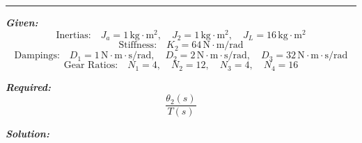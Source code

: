 \documentclass[11pt]{article}
\begin{document}
\noindent\rule{\textwidth}{1pt}

\vspace{12pt}


\noindent\textbf{\textit{Given:}}
\[
\text{Inertias:} \quad J_a = 1\,\text{kg}\cdot\text{m}^2, \quad J_2 = 1\,\text{kg}\cdot\text{m}^2, \quad J_L = 16\,\text{kg}\cdot\text{m}^2
\]
\[
\text{Stiffness:} \quad K_2 = 64\,\text{N}\cdot\text{m/rad}
\]
\[
\text{Dampings:} \quad D_1 = 1\,\text{N}\cdot\text{m}\cdot\text{s/rad}, \quad D_2 = 2\,\text{N}\cdot\text{m}\cdot\text{s/rad}, \quad D_3 = 32\,\text{N}\cdot\text{m}\cdot\text{s/rad}
\]
\[
\text{Gear Ratios:} \quad N_1 = 4, \quad N_2 = 12, \quad N_3 = 4, \quad N_4 = 16
\]

\vspace{1em}
\noindent

\noindent\textbf{\textit{Required:}}
\[
\frac{\theta_2(s)}{T(s)}
\]

\vspace{1.5em}
\noindent\textbf{\textit{Solution:}}
\end{document}
